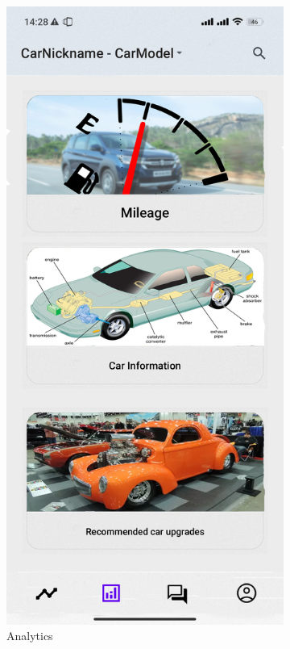 \documentclass[11pt]{scrartcl} %
\begin{document}
\begin{figure}[!htb]
\begin{subfigure}{.5\textwidth}
  \includegraphics[width=.6\linewidth]{assets/analytics_mock_up.png}
  \caption{Analytics}
  \label{fig:sfig2}
\end{subfigure}
\label{fig:fig}
\par\bigskip %
\begin{subfigure}{.5\textwidth}
  \centering

\end{subfigure}
\end{figure}
\end{document}

